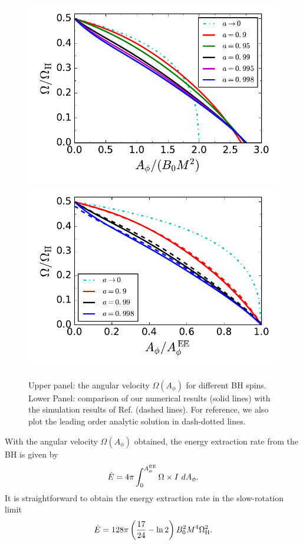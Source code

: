 \documentclass[aps,prd,reprint,nofootinbib, superscriptaddress]{revtex4-1}
\def\Ap{A_\phi}
\def\be{\begin{equation}}
\def\ee{\end{equation}}
\def\WH{\Omega_{\rm H}}
\def\AEE{A_\phi^{\rm EE}}
\begin{document}
\begin{figure}
\includegraphics[scale=0.7]{f2a}
\includegraphics[scale=0.7]{f2b}
\caption{\label{fig:omega} Upper panel: the angular velocity  $\Omega(\Ap)$ for different BH spins.
Lower Panel: comparison of our numerical results (solid lines) with the simulation results of
Ref. \cite{East2018} (dashed lines). For reference, we also plot the leading order analytic solution in
dash-dotted lines.}
\end{figure}


With the angular velocity $\Omega(\Ap)$ obtained, the energy extraction rate from the BH is given by
\be
\label{eq:Edot}
\dot E = 4\pi \int_0^{\AEE} \Omega \times I \ d \Ap.
\ee
It is straightforward to obtain the energy extraction rate in the slow-rotation limit
\be
\label{eq:lowEdot}
\dot E = 128\pi \left(\frac{17}{24}-\ln 2\right) B_0^2 M^4 \WH^2.
\ee
\end{document}
